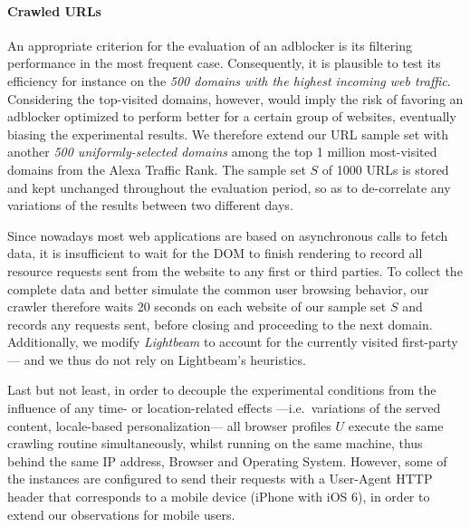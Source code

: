 \paragraph{Crawled URLs}
\label{sec:crawled_urls}
An appropriate criterion for the evaluation of an adblocker is its filtering performance in the most frequent case. Consequently, it is plausible to test its efficiency for instance on the \textit{500 domains with the highest incoming web traffic}. Considering the top-visited domains, however, would imply the risk of favoring an adblocker optimized to perform better for a certain group of websites, eventually biasing the experimental results. We therefore extend our URL sample set with another \textit{500 uniformly-selected domains} among the top 1 million most-visited domains from the Alexa Traffic Rank. The sample set $S$ of 1000 URLs is stored and kept unchanged throughout the evaluation period, so as to de-correlate any variations of the results between two different days.

Since nowadays most web applications are based on asynchronous calls to fetch data, it is insufficient to wait for the DOM to finish rendering to record all resource requests sent from the website to any first or third parties. To collect the complete data and better simulate the common user browsing behavior, our crawler therefore waits 20 seconds on each website of our sample set $S$ and records any requests sent, before closing and proceeding to the next domain. Additionally, we modify \textit{Lightbeam} to account for the currently visited first-party --- and we thus do not rely on Lightbeam's heuristics.

Last but not least, in order to decouple the experimental conditions from the influence of any time- or location-related effects ---i.e.\ variations of the served content, locale-based personalization--- all browser profiles $U$ execute the same crawling routine simultaneously, whilst running on the same machine, thus behind the same IP address, Browser and Operating System. However, some of the instances are configured to send their requests with a User-Agent HTTP header that corresponds to a mobile device (iPhone with iOS 6), in order to extend our observations for mobile users.

